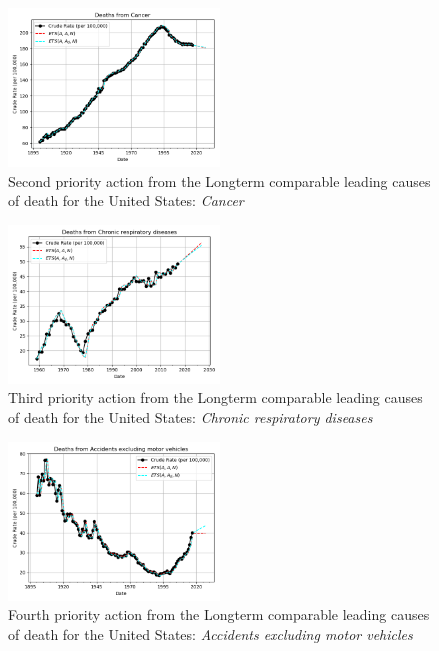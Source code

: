 \documentclass[10pt, a4paper, twocolumn]{IEEEconf}
\begin{document}
\begin{figure}[H]
  \centering
  \includegraphics[width=0.5\textwidth]{results/US_ICD_LONGTERM_COMPARABLE_LEADING/Cancer_ets.png}
  \caption{Second priority action from the Longterm comparable leading causes of death for the United States: \textit{Cancer}}\label{fig:k1b}
\end{figure}

\begin{figure}[H]
  \centering
  \includegraphics[width=0.5\textwidth]{results/US_ICD_LONGTERM_COMPARABLE_LEADING/Chronic_respiratory_diseases_ets.png}
  \caption{Third priority action from the Longterm comparable leading causes of death for the United States: \textit{Chronic respiratory diseases}}\label{fig:k1c}
\end{figure}

\begin{figure}[H]
  \centering
  \includegraphics[width=0.5\textwidth]{results/US_ICD_LONGTERM_COMPARABLE_LEADING/Accidents_excluding_motor_vehicles_ets.png}
  \caption{Fourth priority action from the Longterm comparable leading causes of death for the United States: \textit{Accidents excluding motor vehicles}}\label{fig:k1d}
\end{figure}
\end{document}

